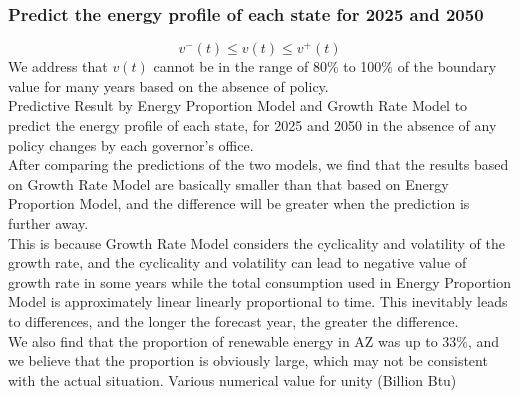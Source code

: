 \documentclass{mcmthesis}
\begin{document}
\subsubsection{Predict the energy profile of each state for 2025 and 2050}	
\begin{equation}
v^{-}(t) \leq v(t) \leq v^{+}(t)
\end{equation}
We address that $ v(t) $ cannot be in the range of 80\% to 100\% of the boundary value for many years based on the absence of policy.\\
Predictive Result by Energy Proportion Model and Growth Rate Model to predict the energy profile of each state, for 2025 and 2050 in the absence of any policy changes by each governor’s office.\\
After comparing the predictions of the two models, we find that the results based on Growth Rate Model are basically smaller than that based on Energy Proportion Model, and the difference will be greater when the prediction is further away. \\
This is because Growth Rate Model considers the cyclicality and volatility of the growth rate, and the cyclicality and volatility can lead to negative value of growth rate in some years while the total consumption used in Energy Proportion Model is approximately linear linearly proportional to time.
This inevitably leads to differences, and the longer the forecast year, the greater the difference. \\
We also find that the proportion of renewable energy in AZ was up to 33\%, and we believe that the proportion is obviously large, which may not be consistent with the actual situation.
Various numerical value for unity (Billion Btu)
\end{document}
